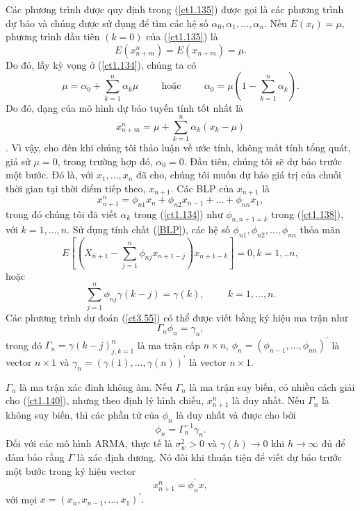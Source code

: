 \documentclass[12pt, a4paper,oneside]{book}
\theoremstyle{definition}
\begin{document}
Các phương trình được quy định trong (\ref{ct1.135}) được gọi là các phương trình dự báo và chúng được sử dụng để tìm các hệ số ${\alpha_{0}, \alpha_{1} ,\dots,\alpha_{n}}$. Nếu $E(x_{t}) =\mu $, phương trình đầu tiên $(k = 0)$ của (\ref{ct1.135}) là $$E(x_{n+m}^n)= E (x_{n+m})= \mu.$$
Do đó, lấy kỳ vọng ở (\ref{ct1.134}), chúng ta có
$$\mu= \alpha_{0} + \sum_{k=1}^{n} \alpha_k\mu \hspace{1cm} \text{hoặc} \hspace{1cm} \alpha_0 =\mu(1-\sum_{k=1}^{n}\alpha_k).$$ 	
Do đó, dạng của mô hình dự báo tuyến tính tốt nhất là
$$x_{n+m}^{n}=\mu+\sum_{k=1}^{n}\alpha_k(x_k-\mu)$$.
Vì vậy, cho đến khi chúng tôi thảo luận về ước tính, không mất tính tổng quát, giả sử $ \mu= 0$, trong trường hợp đó, $\alpha_{0} = 0.$ Đầu tiên, chúng tôi sẽ dự báo trước một bước. Đó là, với ${x_{1},. . . , x_{n}}$ đã cho, chúng tôi muốn dự báo giá trị của chuỗi thời gian tại thời điểm tiếp theo, $x_{n+1}$. Các BLP của $x_{n+1}$ là
\begin{equation}
x_{n+1}^n = \phi_{n1}x_{n}+ \phi_{n2}x_{n-1}+...+ \phi_{nn}x_{1}, \label{ct1.138}
\end{equation}
trong đó chúng tôi đã viết $\alpha_{k}$ trong (\ref{ct1.134}) như $\phi_{n,n+1=k}$ trong (\ref{ct1.138}), với $k = 1,\dots, n$. Sử dụng tính chất (\ref{BLP}), các hệ số ${\phi_{n1}, \phi_{n2},\dots,\phi_{nn}}$ thỏa mãn
$$E[(X_{n+1} - \sum_{j=1}^{n} \phi_{nj}x_{n+1-j})x_{n+1-k}] =0, k=1,..n,$$ hoặc 
\begin{equation}
	\sum_{j=1}^{n}\phi_{nj}\gamma(k-j)=\gamma(k), \hspace{1cm} k=1,\dots,n. \label{ct3.55}
\end{equation}
Các phương trình dự đoán (\ref{ct3.55}) có thể được viết bằng ký hiệu ma trận như
\begin{equation}
\Gamma_{n}\phi_{n}= \gamma_{n}, \label{ct1.140}
\end{equation}
trong đó $\Gamma_n={\gamma(k-j)}_{j,k=1}^{n}$ là ma trận cấp $n\times n$, $\phi_n=(\phi_{n-1},\dots,\phi_{nn})^{'}$ là vector $n\times 1$ và $\gamma_n=(\gamma(1),\dots,\gamma(n))^{'}$ là vector $n\times 1$.
	
$\Gamma_{n}$ là ma trận xác đinh không âm. Nếu $\Gamma_n$ là ma trận suy biến, có nhiều cách giải cho (\ref{ct1.140}), nhưng theo định lý hình chiếu, $x_{n+1}^{n}$ là duy nhất. Nếu $\Gamma_n$ là không suy biến, thì các phần tử của $\phi_n$ là duy nhất và được cho bởi
\begin{equation}
\phi_{n}= \Gamma_{n}^{-1}\gamma_{n}. \label{ct1.141}
\end{equation}
Đối với các mô hình ARMA, thực tế là $\sigma^{2}_{w}> 0$ và $\gamma(h) \rightarrow 0$ khi $h \rightarrow  \infty$  đủ để đảm bảo rằng $\Gamma$ là xác định dương. Nó đôi khi thuận tiện để viết dự báo trước một bước trong ký hiệu vector
\begin{equation}
x^{n}_{n+1}= \phi_{n}^{'}x, \label{ct1.142}	
\end{equation}
với mọi $x= (x_{n}, x_{n-1},...,x_{1})^{'}.$
\end{document}
